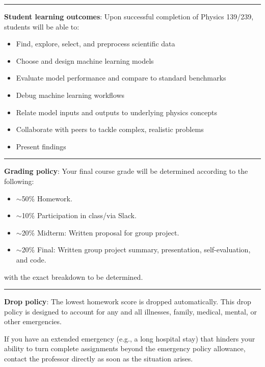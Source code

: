 \documentclass[12pt]{article}
\begin{document}
\begin{center}
	\rule{\textwidth}{0.5pt}
\end{center}

\noindent\textbf{Student learning outcomes}: Upon successful completion of Physics 139/239, students will be able to:
\begin{itemize}
	\item Find, explore, select, and preprocess scientific data
	\item Choose and design machine learning models
	\item Evaluate model performance and compare to standard benchmarks
	\item Debug machine learning workflows
	\item Relate model inputs and outputs to underlying physics concepts
	\item Collaborate with peers to tackle complex, realistic problems
	\item Present findings
\end{itemize}

\begin{center}
	\rule{\textwidth}{0.5pt}
\end{center}

\noindent\textbf{Grading policy}: Your final course grade will be determined according to the following:
\begin{itemize}
	\item $\sim$50\% Homework.
	\item $\sim$10\% Participation in class/via Slack.
	\item $\sim$20\% Midterm: Written proposal for group project.
	\item $\sim$20\% Final: Written group project summary, presentation, self-evaluation, and code.
\end{itemize}
with the exact breakdown to be determined.

\begin{center}
	\rule{\textwidth}{0.5pt}
\end{center}

\noindent\textbf{Drop policy}: The lowest homework score is dropped automatically.
This drop policy is designed to account for any and all illnesses, family, medical, mental, or other emergencies.

If you have an extended emergency (e.g., a long hospital stay) that hinders your ability to turn complete assignments beyond the emergency policy allowance, contact the professor directly as soon as the situation arises.
\end{document}
